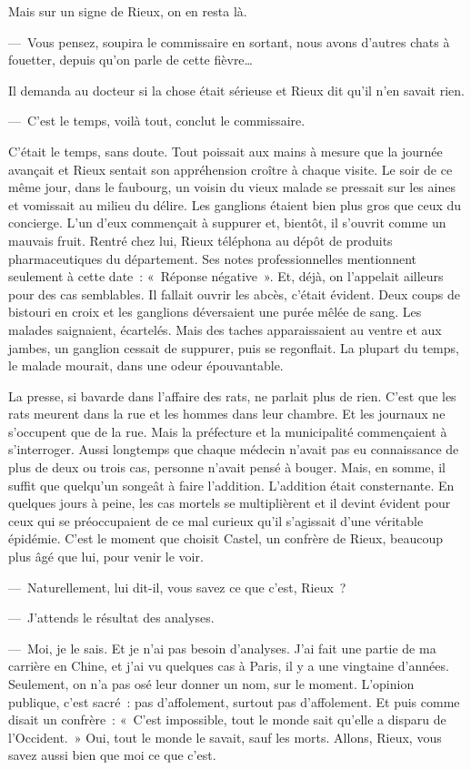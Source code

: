 \documentclass[french,twoside]{book} %
\begin{document}
Mais sur un signe de Rieux, on en resta là.\par
— Vous pensez, soupira le commissaire en sortant, nous avons d’autres chats à fouetter, depuis qu’on parle de cette fièvre…\par
Il demanda au docteur si la chose était sérieuse et Rieux dit qu’il n’en savait rien.\par
— C’est le temps, voilà tout, conclut le commissaire.\par
C’était le temps, sans doute. Tout poissait aux mains à mesure que la journée avançait et Rieux sentait son appréhension croître à chaque visite. Le soir de ce même jour, dans le faubourg, un voisin du vieux malade se pressait sur les aines et vomissait au milieu du délire. Les ganglions étaient bien plus gros que ceux du concierge. L’un d’eux commençait à suppurer et, bientôt, il s’ouvrit comme un mauvais fruit. Rentré chez lui, Rieux téléphona au dépôt de produits pharmaceutiques du département. Ses notes professionnelles mentionnent seulement à cette date : « Réponse négative ». Et, déjà, on l’appelait ailleurs pour des cas semblables. Il fallait ouvrir les abcès, c’était évident. Deux coups de bistouri en croix et les ganglions déversaient une purée mêlée de sang. Les malades saignaient, écartelés. Mais des taches apparaissaient au ventre et aux jambes, un ganglion cessait de suppurer, puis se regonflait. La plupart du temps, le malade mourait, dans une odeur épouvantable.\par
La presse, si bavarde dans l’affaire des rats, ne parlait plus de rien. C’est que les rats meurent dans la rue et les hommes dans leur chambre. Et les journaux ne s’occupent que de la rue. Mais la préfecture et la municipalité commençaient à s’interroger. Aussi longtemps que chaque médecin n’avait pas eu connaissance de plus de deux ou trois cas, personne n’avait pensé à bouger. Mais, en somme, il suffit que quelqu’un songeât à faire l’addition. L’addition était consternante. En quelques jours à peine, les cas mortels se multiplièrent et il devint évident pour ceux qui se préoccupaient de ce mal curieux qu’il s’agissait d’une véritable épidémie. C’est le moment que choisit Castel, un confrère de Rieux, beaucoup plus âgé que lui, pour venir le voir.\par
— Naturellement, lui dit-il, vous savez ce que c’est, Rieux ?\par
— J’attends le résultat des analyses.\par
— Moi, je le sais. Et je n’ai pas besoin d’analyses. J’ai fait une partie de ma carrière en Chine, et j’ai vu quelques cas à Paris, il y a une vingtaine d’années. Seulement, on n’a pas osé leur donner un nom, sur le moment. L’opinion publique, c’est sacré : pas d’affolement, surtout pas d’affolement. Et puis comme disait un confrère : « C’est impossible, tout le monde sait qu’elle a disparu de l’Occident. » Oui, tout le monde le savait, sauf les morts. Allons, Rieux, vous savez aussi bien que moi ce que c’est.\par
\end{document}
